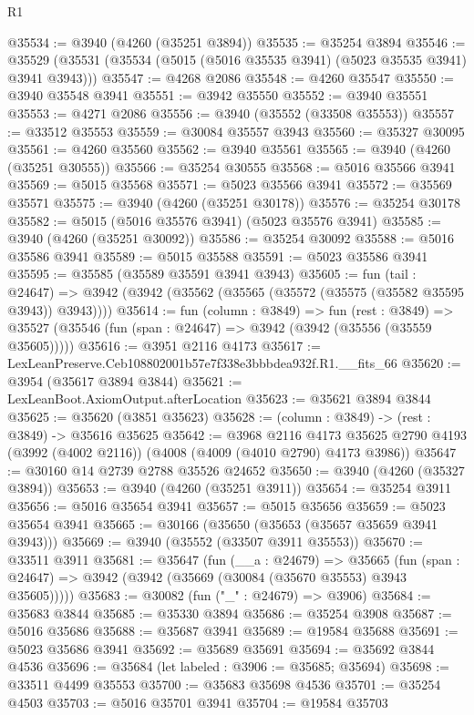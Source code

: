 \begin{lexlean}{R1}
\begin{coremodule}
@35534 := @3940 (@4260 (@35251 @3894))
@35535 := @35254 @3894
@35546 := @35529 (@35531 (@35534 (@5015 (@5016 @35535 @3941) (@5023 @35535 @3941) @3941 @3943)))
@35547 := @4268 @2086
@35548 := @4260 @35547
@35550 := @3940 @35548 @3941
@35551 := @3942 @35550
@35552 := @3940 @35551
@35553 := @4271 @2086
@35556 := @3940 (@35552 (@33508 @35553))
@35557 := @33512 @35553
@35559 := @30084 @35557 @3943
@35560 := @35327 @30095
@35561 := @4260 @35560
@35562 := @3940 @35561
@35565 := @3940 (@4260 (@35251 @30555))
@35566 := @35254 @30555
@35568 := @5016 @35566 @3941
@35569 := @5015 @35568
@35571 := @5023 @35566 @3941
@35572 := @35569 @35571
@35575 := @3940 (@4260 (@35251 @30178))
@35576 := @35254 @30178
@35582 := @5015 (@5016 @35576 @3941) (@5023 @35576 @3941)
@35585 := @3940 (@4260 (@35251 @30092))
@35586 := @35254 @30092
@35588 := @5016 @35586 @3941
@35589 := @5015 @35588
@35591 := @5023 @35586 @3941
@35595 := @35585 (@35589 @35591 @3941 @3943)
@35605 := fun (tail : @24647) =>
  @3942 (@3942 (@35562 (@35565 (@35572 (@35575 (@35582 @35595 @3943)) @3943))))
@35614 := fun (column : @3849) =>
  fun (rest : @3849) =>
  @35527 (@35546 (fun (span : @24647) => @3942 (@3942 (@35556 (@35559 @35605)))))
@35616 := @3951 @2116 @4173
@35617 := LexLeanPreserve.Ceb108802001b57e7f338e3bbbdea932f.R1.__fits_66
@35620 := @3954 (@35617 @3894 @3844)
@35621 := LexLeanBoot.AxiomOutput.afterLocation
@35623 := @35621 @3894 @3844
@35625 := @35620 (@3851 @35623)
@35628 := (column : @3849) -> (rest : @3849) -> @35616 @35625
@35642 := @3968
    @2116
    @4173
    @35625
    @2790
    @4193
    (@3992 (@4002 @2116))
    (@4008 (@4009 (@4010 @2790) @4173 @3986))
@35647 := @30160 @14 @2739 @2788 @35526 @24652
@35650 := @3940 (@4260 (@35327 @3894))
@35653 := @3940 (@4260 (@35251 @3911))
@35654 := @35254 @3911
@35656 := @5016 @35654 @3941
@35657 := @5015 @35656
@35659 := @5023 @35654 @3941
@35665 := @30166 (@35650 (@35653 (@35657 @35659 @3941 @3943)))
@35669 := @3940 (@35552 (@33507 @3911 @35553))
@35670 := @33511 @3911
@35681 := @35647
    (fun (__a : @24679) =>
    @35665 (fun (span : @24647) => @3942 (@3942 (@35669 (@30084 (@35670 @35553) @3943 @35605)))))
@35683 := @30082 (fun ("_" : @24679) => @3906)
@35684 := @35683 @3844
@35685 := @35330 @3894
@35686 := @35254 @3908
@35687 := @5016 @35686
@35688 := @35687 @3941
@35689 := @19584 @35688
@35691 := @5023 @35686 @3941
@35692 := @35689 @35691
@35694 := @35692 @3844 @4536
@35696 := @35684 (let labeled : @3906 := @35685; @35694)
@35698 := @33511 @4499 @35553
@35700 := @35683 @35698 @4536
@35701 := @35254 @4503
@35703 := @5016 @35701 @3941
@35704 := @19584 @35703

\end{coremodule}
\end{lexlean}
